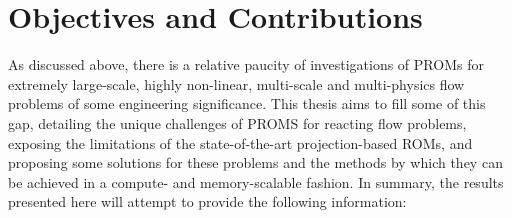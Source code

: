 \section{Objectives and Contributions}

As discussed above, there is a relative paucity of investigations of PROMs for extremely large-scale, highly non-linear, multi-scale and multi-physics flow problems of some engineering significance. This thesis aims to fill some of this gap, detailing the unique challenges of PROMS for reacting flow problems, exposing the limitations of the state-of-the-art projection-based ROMs, and proposing some solutions for these problems and the methods by which they can be achieved in a compute- and memory-scalable fashion. In summary, the results presented here will attempt to provide the following information:

